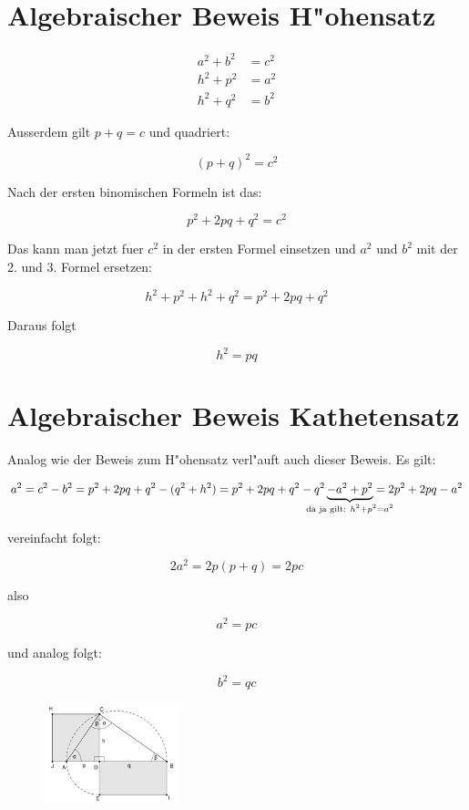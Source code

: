 \documentclass{article}
\begin{document}
\section{Algebraischer Beweis H"ohensatz}

\begin{align*}
a^2 + b^2 &= c^2\\ 
h^2 + p^2 &= a^2\\
h^2 + q^2 &= b^2
\end{align*}

Ausserdem gilt \( p+q = c \) und quadriert:

\[ (p + q)^2 = c^2\]

Nach der ersten binomischen Formeln ist das:

\[ p^2 + 2pq + q^2 = c^2 \]

Das kann man jetzt fuer $c^2$ in der ersten Formel einsetzen und $a^2$ und $b^2$ mit der 2. und 3. Formel ersetzen:

\[ h^2 + p^2 + h^2 + q^2 = p^2 + 2pq + q^2 \]

Daraus folgt

\[ h^2=pq \]

\section{Algebraischer Beweis Kathetensatz}

Analog wie der Beweis zum H"ohensatz verl"auft auch dieser Beweis. Es gilt:

\[ a^2 = c^2-b^2=p^2+2pq+q^2-(q^2+h^2)=p^2+2pq+q^2-q^2\underbrace{-a^2+p^2}_{\mathclap{\text{da ja gilt: } h^2 + p^2 = a^2}}=2p^2+2pq-a^2 \]

vereinfacht folgt:

\[ 2a^2 = 2p(p + q) = 2pc \]

also 

\[ a^2 = pc \]

und analog folgt:

\[ b^2 = qc \]

\begin{figure}[h]
\centering
\includegraphics[width=0.35\textwidth]{Hoehensatz}
\end{figure}


\newpage
\begin{figure}[t]
\end{figure}
\end{document}
